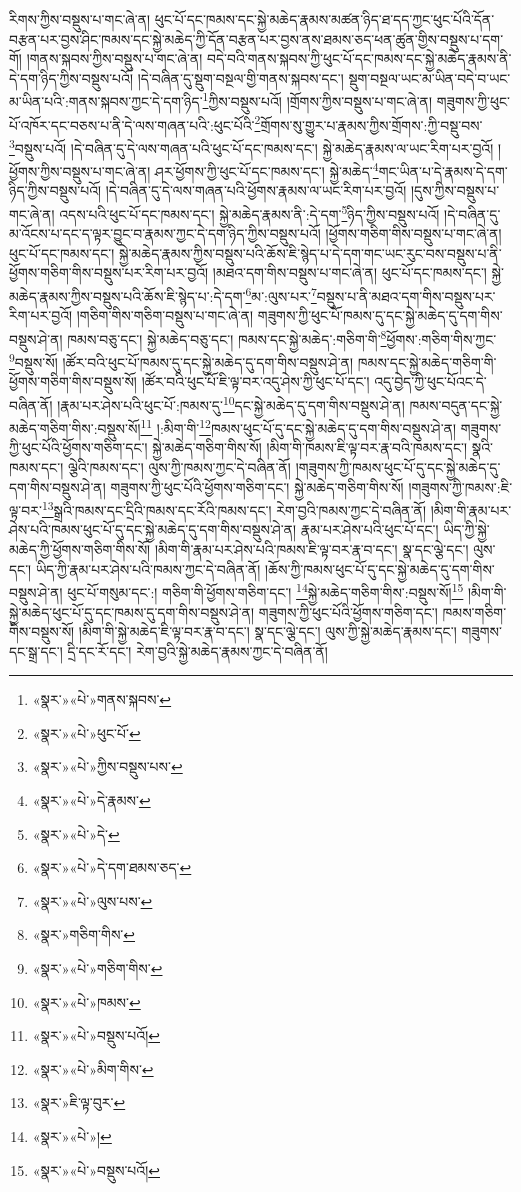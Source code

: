 རིགས་ཀྱིས་བསྡུས་པ་གང་ཞེ་ན། ཕུང་པོ་དང་ཁམས་དང་སྐྱེ་མཆེད་རྣམས་མཚན་ཉིད་ཐ་དད་ཀྱང་ཕུང་པོའི་དོན་བརྩན་པར་བྱས་ཤིང་ཁམས་དང་སྐྱེ་མཆེད་ཀྱི་དོན་བརྩན་པར་བྱས་ནས་ཐམས་ཅད་ཕན་ཚུན་གྱིས་བསྡུས་པ་དག་གོ། །གནས་སྐབས་ཀྱིས་བསྡུས་པ་གང་ཞེ་ན། བདེ་བའི་གནས་སྐབས་ཀྱི་ཕུང་པོ་དང་ཁམས་དང་སྐྱེ་མཆེད་རྣམས་ནི་དེ་དག་ཉིད་ཀྱིས་བསྡུས་པའོ། །དེ་བཞིན་དུ་སྡུག་བསྔལ་གྱི་གནས་སྐབས་དང་། སྡུག་བསྔལ་ཡང་མ་ཡིན་བདེ་བ་ཡང་མ་ཡིན་པའི་:གནས་སྐབས་ཀྱང་དེ་དག་ཉིད་\footnote{«སྣར་»«པེ་»གནས་སྐབས་}ཀྱིས་བསྡུས་པའོ། །གྲོགས་ཀྱིས་བསྡུས་པ་གང་ཞེ་ན། གཟུགས་ཀྱི་ཕུང་པོ་འཁོར་དང་བཅས་པ་ནི་དེ་ལས་གཞན་པའི་:ཕུང་པོའི་\footnote{«སྣར་»«པེ་»ཕུང་པོ་}གྲོགས་སུ་གྱུར་པ་རྣམས་ཀྱིས་གྲོགས་:ཀྱི་བསྡུ་བས་\footnote{«སྣར་»«པེ་»ཀྱིས་བསྡུས་པས་}བསྡུས་པའོ། །དེ་བཞིན་དུ་དེ་ལས་གཞན་པའི་ཕུང་པོ་དང་ཁམས་དང་། སྐྱེ་མཆེད་རྣམས་ལ་ཡང་རིག་པར་བྱའོ། །ཕྱོགས་ཀྱིས་བསྡུས་པ་གང་ཞེ་ན། ཤར་ཕྱོགས་ཀྱི་ཕུང་པོ་དང་ཁམས་དང་། སྐྱེ་མཆེད་\footnote{«སྣར་»«པེ་»དེ་རྣམས་}གང་ཡིན་པ་དེ་རྣམས་དེ་དག་ཉིད་ཀྱིས་བསྡུས་པའོ། །དེ་བཞིན་དུ་དེ་ལས་གཞན་པའི་ཕྱོགས་རྣམས་ལ་ཡང་རིག་པར་བྱའོ། །དུས་ཀྱིས་བསྡུས་པ་གང་ཞེ་ན། འདས་པའི་ཕུང་པོ་དང་ཁམས་དང་། སྐྱེ་མཆེད་རྣམས་ནི་:དེ་དག་\footnote{«སྣར་»«པེ་»དེ་}ཉིད་ཀྱིས་བསྡུས་པའོ། །དེ་བཞིན་དུ་མ་འོངས་པ་དང་ད་ལྟར་བྱུང་བ་རྣམས་ཀྱང་དེ་དག་ཉིད་ཀྱིས་བསྡུས་པའོ། །ཕྱོགས་གཅིག་གིས་བསྡུས་པ་གང་ཞེ་ན། ཕུང་པོ་དང་ཁམས་དང་། སྐྱེ་མཆེད་རྣམས་ཀྱིས་བསྡུས་པའི་ཆོས་ཇི་སྙེད་པ་དེ་དག་གང་ཡང་རུང་བས་བསྡུས་པ་ནི་ཕྱོགས་གཅིག་གིས་བསྡུས་པར་རིག་པར་བྱའོ། །མཐའ་དག་གིས་བསྡུས་པ་གང་ཞེ་ན། ཕུང་པོ་དང་ཁམས་དང་། སྐྱེ་མཆེད་རྣམས་ཀྱིས་བསྡུས་པའི་ཆོས་ཇི་སྙེད་པ་:དེ་དག་\footnote{«སྣར་»«པེ་»དེ་དག་ཐམས་ཅད་}མ་:ལུས་པར་\footnote{«སྣར་»«པེ་»ལུས་པས་}བསྡུས་པ་ནི་མཐའ་དག་གིས་བསྡུས་པར་རིག་པར་བྱའོ། །གཅིག་གིས་གཅིག་བསྡུས་པ་གང་ཞེ་ན། གཟུགས་ཀྱི་ཕུང་པོ་ཁམས་དུ་དང་སྐྱེ་མཆེད་དུ་དག་གིས་བསྡུས་ཤེ་ན། ཁམས་བཅུ་དང་། སྐྱེ་མཆེད་བཅུ་དང་། ཁམས་དང་སྐྱེ་མཆེད་:གཅིག་གི་\footnote{«སྣར་»གཅིག་གིས་}ཕྱོགས་:གཅིག་གིས་ཀྱང་\footnote{«སྣར་»«པེ་»གཅིག་གིས་}བསྡུས་སོ། །ཚོར་བའི་ཕུང་པོ་ཁམས་དུ་དང་སྐྱེ་མཆེད་དུ་དག་གིས་བསྡུས་ཤེ་ན། ཁམས་དང་སྐྱེ་མཆེད་གཅིག་གི་ཕྱོགས་གཅིག་གིས་བསྡུས་སོ། །ཚོར་བའི་ཕུང་པོ་ཇི་ལྟ་བར་འདུ་ཤེས་ཀྱི་ཕུང་པོ་དང་། འདུ་བྱེད་ཀྱི་ཕུང་པོའང་དེ་བཞིན་ནོ། །རྣམ་པར་ཤེས་པའི་ཕུང་པོ་:ཁམས་དུ་\footnote{«སྣར་»«པེ་»ཁམས་}དང་སྐྱེ་མཆེད་དུ་དག་གིས་བསྡུས་ཤེ་ན། ཁམས་བདུན་དང་སྐྱེ་མཆེད་གཅིག་གིས་:བསྡུས་སོ།\footnote{«སྣར་»«པེ་»བསྡུས་པའོ།} །:མིག་གི་\footnote{«སྣར་»«པེ་»མིག་གིས་}ཁམས་ཕུང་པོ་དུ་དང་སྐྱེ་མཆེད་དུ་དག་གིས་བསྡུས་ཤེ་ན། གཟུགས་ཀྱི་ཕུང་པོའི་ཕྱོགས་གཅིག་དང་། སྐྱེ་མཆེད་གཅིག་གིས་སོ། །མིག་གི་ཁམས་ཇི་ལྟ་བར་རྣ་བའི་ཁམས་དང་། སྣའི་ཁམས་དང་། ལྕེའི་ཁམས་དང་། ལུས་ཀྱི་ཁམས་ཀྱང་དེ་བཞིན་ནོ། །གཟུགས་ཀྱི་ཁམས་ཕུང་པོ་དུ་དང་སྐྱེ་མཆེད་དུ་དག་གིས་བསྡུས་ཤེ་ན། གཟུགས་ཀྱི་ཕུང་པོའི་ཕྱོགས་གཅིག་དང་། སྐྱེ་མཆེད་གཅིག་གིས་སོ། །གཟུགས་ཀྱི་ཁམས་:ཇི་ལྟ་བར་\footnote{«སྣར་»ཇི་ལྟ་བུར་}སྒྲའི་ཁམས་དང་དྲིའི་ཁམས་དང་རོའི་ཁམས་དང་། རེག་བྱའི་ཁམས་ཀྱང་དེ་བཞིན་ནོ། །མིག་གི་རྣམ་པར་ཤེས་པའི་ཁམས་ཕུང་པོ་དུ་དང་སྐྱེ་མཆེད་དུ་དག་གིས་བསྡུས་ཤེ་ན། རྣམ་པར་ཤེས་པའི་ཕུང་པོ་དང་། ཡིད་ཀྱི་སྐྱེ་མཆེད་ཀྱི་ཕྱོགས་གཅིག་གིས་སོ། །མིག་གི་རྣམ་པར་ཤེས་པའི་ཁམས་ཇི་ལྟ་བར་རྣ་བ་དང་། སྣ་དང་ལྕེ་དང་། ལུས་དང་། ཡིད་ཀྱི་རྣམ་པར་ཤེས་པའི་ཁམས་ཀྱང་དེ་བཞིན་ནོ། །ཆོས་ཀྱི་ཁམས་ཕུང་པོ་དུ་དང་སྐྱེ་མཆེད་དུ་དག་གིས་བསྡུས་ཤེ་ན། ཕུང་པོ་གསུམ་དང་:། གཅིག་གི་ཕྱོགས་གཅིག་དང་། \footnote{«སྣར་»«པེ་»།  }སྐྱེ་མཆེད་གཅིག་གིས་:བསྡུས་སོ།\footnote{«སྣར་»«པེ་»བསྡུས་པའོ།} །མིག་གི་སྐྱེ་མཆེད་ཕུང་པོ་དུ་དང་ཁམས་དུ་དག་གིས་བསྡུས་ཤེ་ན། གཟུགས་ཀྱི་ཕུང་པོའི་ཕྱོགས་གཅིག་དང་། ཁམས་གཅིག་གིས་བསྡུས་སོ། །མིག་གི་སྐྱེ་མཆེད་ཇི་ལྟ་བར་རྣ་བ་དང་། སྣ་དང་ལྕེ་དང་། ལུས་ཀྱི་སྐྱེ་མཆེད་རྣམས་དང་། གཟུགས་དང་སྒྲ་དང་། དྲི་དང་རོ་དང་། རེག་བྱའི་སྐྱེ་མཆེད་རྣམས་ཀྱང་དེ་བཞིན་ནོ། 